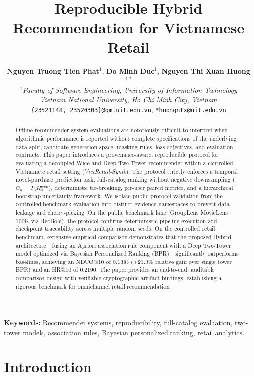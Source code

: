 \documentclass[10pt,a4paper]{article}
\title{\textbf{Reproducible Hybrid Recommendation for Vietnamese Retail}}
\author{
  \textbf{Nguyen Truong Tien Phat}$^{1}$, \textbf{Do Minh Duc}$^{1}$, \textbf{Nguyen Thi Xuan Huong}$^{1,*}$\\[0.25cm]
  $^{1}$\textit{Faculty of Software Engineering, University of Information Technology}\\
  \textit{Vietnam National University, Ho Chi Minh City, Vietnam}\\
  \texttt{\{23521148, 23520303\}@gm.uit.edu.vn}, \texttt{*huongntx@uit.edu.vn}
}
\date{}
\begin{document}
\maketitle

\begin{abstract}
Offline recommender system evaluations are notoriously difficult to interpret when algorithmic performance is reported without complete specifications of the underlying data split, candidate generation space, masking rules, loss objectives, and evaluation contracts. This paper introduces a provenance-aware, reproducible protocol for evaluating a decoupled Wide-and-Deep Two-Tower recommender within a controlled Vietnamese retail setting (\textit{VietRetail-Synth}). The protocol strictly enforces a temporal novel-purchase prediction task, full-catalog ranking without negative downsampling ($C_u = I \setminus H_u^{\mathrm{seen}}$), deterministic tie-breaking, per-user paired metrics, and a hierarchical bootstrap uncertainty framework. We isolate public protocol validation from the controlled benchmark evaluation into distinct evidence namespaces to prevent data leakage and cherry-picking. On the public benchmark lane (GroupLens MovieLens 100K via RecBole), the protocol confirms deterministic pipeline execution and checkpoint traceability across multiple random seeds. On the controlled retail benchmark, extensive empirical comparison demonstrates that the proposed Hybrid architecture—fusing an Apriori association rule component with a Deep Two-Tower model optimized via Bayesian Personalized Ranking (BPR)—significantly outperforms baselines, achieving an NDCG@10 of 0.1385 (+21.3\% relative gain over single-tower BPR) and an HR@10 of 0.2190. The paper provides an end-to-end, auditable comparison design with verifiable cryptographic artifact bindings, establishing a rigorous benchmark for omnichannel retail recommendation.
\end{abstract}

\noindent\textbf{Keywords:} Recommender systems, reproducibility, full-catalog evaluation, two-tower models, association rules, Bayesian personalized ranking, retail analytics.

\section{Introduction}
\end{document}
